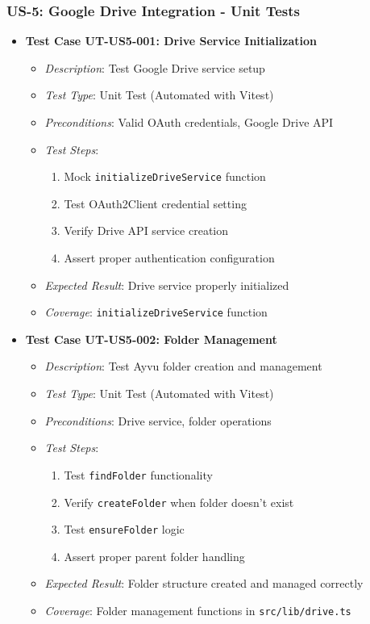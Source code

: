 \documentclass[12pt]{article}
\begin{document}
\subsubsection{US-5: Google Drive Integration - Unit Tests}
\begin{itemize}
  \item \textbf{Test Case UT-US5-001: Drive Service Initialization}
    \begin{itemize}
      \item \textit{Description}: Test Google Drive service setup
      \item \textit{Test Type}: Unit Test (Automated with Vitest)
      \item \textit{Preconditions}: Valid OAuth credentials, Google Drive API
      \item \textit{Test Steps}:
        \begin{enumerate}
          \item Mock \texttt{initializeDriveService} function
          \item Test OAuth2Client credential setting
          \item Verify Drive API service creation
          \item Assert proper authentication configuration
        \end{enumerate}
      \item \textit{Expected Result}: Drive service properly initialized
      \item \textit{Coverage}: \texttt{initializeDriveService} function
    \end{itemize}

  \item \textbf{Test Case UT-US5-002: Folder Management}
    \begin{itemize}
      \item \textit{Description}: Test Ayvu folder creation and management
      \item \textit{Test Type}: Unit Test (Automated with Vitest)
      \item \textit{Preconditions}: Drive service, folder operations
      \item \textit{Test Steps}:
        \begin{enumerate}
          \item Test \texttt{findFolder} functionality
          \item Verify \texttt{createFolder} when folder doesn't exist
          \item Test \texttt{ensureFolder} logic
          \item Assert proper parent folder handling
        \end{enumerate}
      \item \textit{Expected Result}: Folder structure created and managed correctly
      \item \textit{Coverage}: Folder management functions in \texttt{src/lib/drive.ts}
    \end{itemize}


\end{itemize}
\end{document}
